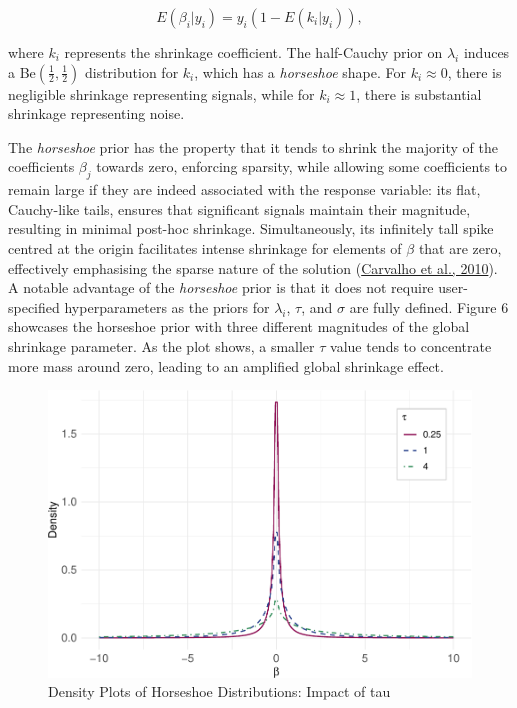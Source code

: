 \documentclass[
  11pt,
]{article}
\begin{document}
\begin{equation}
E(\beta_i|y_i) = y_i(1 - E(k_i|y_i)),
\end{equation}

where \(k_i\) represents the shrinkage coefficient. The half-Cauchy
prior on \(\lambda_i\) induces a Be\((\frac{1}{2}, \frac{1}{2})\)
distribution for \(k_i\), which has a \emph{horseshoe} shape. For
\(k_i \approx 0\), there is negligible shrinkage representing signals,
while for \(k_i \approx 1\), there is substantial shrinkage representing
noise.

The \emph{horseshoe} prior has the property that it tends to shrink the
majority of the coefficients \(\beta_j\) towards zero, enforcing
sparsity, while allowing some coefficients to remain large if they are
indeed associated with the response variable: its flat, Cauchy-like
tails, ensures that significant signals maintain their magnitude,
resulting in minimal post-hoc shrinkage. Simultaneously, its infinitely
tall spike centred at the origin facilitates intense shrinkage for
elements of \(\beta\) that are zero, effectively emphasising the sparse
nature of the solution (\protect\hyperlink{ref-Carvalho2010}{Carvalho et
al., 2010}). A notable advantage of the \emph{horseshoe} prior is that
it does not require user-specified hyperparameters as the priors for
\(\lambda_i\), \(\tau\), and \(\sigma\) are fully defined. Figure 6
showcases the horseshoe prior with three different magnitudes of the
global shrinkage parameter. As the plot shows, a smaller \(\tau\) value
tends to concentrate more mass around zero, leading to an amplified
global shrinkage effect.

\begin{figure}[H]

{\centering \includegraphics[width=0.75\linewidth]{dissertation_files/figure-latex/Horseshoe Priors-1} 

}

\caption{Density Plots of Horseshoe Distributions: Impact of tau}\label{fig:Horseshoe Priors}
\end{figure}
\end{document}
